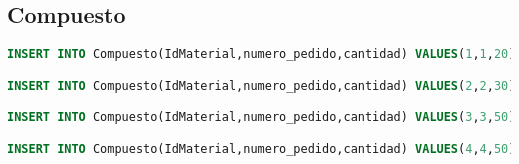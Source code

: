 \subsection{Compuesto}
\begin{lstlisting}[language=sql]
INSERT INTO Compuesto(IdMaterial,numero_pedido,cantidad) VALUES(1,1,20);

INSERT INTO Compuesto(IdMaterial,numero_pedido,cantidad) VALUES(2,2,30);

INSERT INTO Compuesto(IdMaterial,numero_pedido,cantidad) VALUES(3,3,50);

INSERT INTO Compuesto(IdMaterial,numero_pedido,cantidad) VALUES(4,4,50);
\end{lstlisting}
